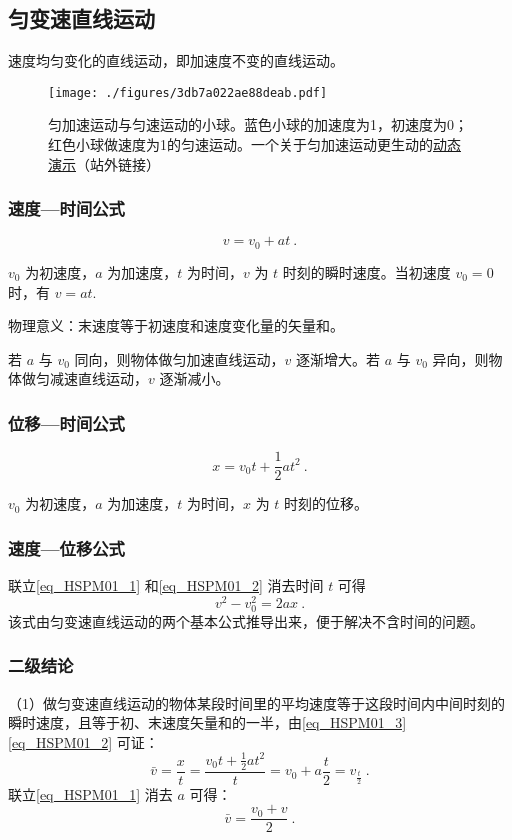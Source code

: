 \subsection{匀变速直线运动}
速度均匀变化的直线运动，即加速度不变的直线运动。
\begin{figure}[ht]
\centering
\texttt{[image: ./figures/3db7a022ae88deab.pdf]}
\caption{匀加速运动与匀速运动的小球。蓝色小球的加速度为1，初速度为0；红色小球做速度为1的匀速运动。一个关于匀加速运动更生动的\href{https://www.geogebra.org/m/kX9C9yDw}{动态演示}（站外链接）} \label{fig_HSPM01_1}
\end{figure}
\subsubsection{速度—时间公式}
\begin{equation}\label{eq_HSPM01_1}
v= v_0+ a t~.
\end{equation}

$v_0$ 为初速度，$a$ 为加速度，$t$ 为时间，$v$ 为 $t$ 时刻的瞬时速度。当初速度 $v_0=0$ 时，有 $v=a t$.

物理意义：末速度等于初速度和速度变化量的矢量和。

若 $a$ 与 $v_0$ 同向，则物体做匀加速直线运动，$v$ 逐渐增大。若 $a$ 与 $v_0$ 异向，则物体做匀减速直线运动，$v$ 逐渐减小。

\subsubsection{位移—时间公式}
\begin{equation}\label{eq_HSPM01_2}
x=v_0 t+\frac12 at^2~.
\end{equation}

$v_0$ 为初速度，$a$ 为加速度，$t$ 为时间，$x$ 为 $t$ 时刻的位移。

\subsubsection{速度—位移公式}
联立\autoref{eq_HSPM01_1} 和\autoref{eq_HSPM01_2} 消去时间 $t$ 可得
\begin{equation}\label{eq_HSPM01_4}
v^2-v_0^2=2ax~.
\end{equation}
该式由匀变速直线运动的两个基本公式推导出来，便于解决不含时间的问题。

\subsubsection{二级结论}
（1）做匀变速直线运动的物体某段时间里的平均速度等于这段时间内中间时刻的瞬时速度，且等于初、末速度矢量和的一半，由\autoref{eq_HSPM01_3} \autoref{eq_HSPM01_2} 可证：
\begin{equation}
\bar v=\frac xt=\frac{v_0t+\frac 12at^2}{t}=v_0+a\frac t2=v_{\frac t2}~.
\end{equation}
联立\autoref{eq_HSPM01_1} 消去 $a$ 可得：
\begin{equation}
\bar v=\frac{v_0+v}{2}~.
\end{equation}

